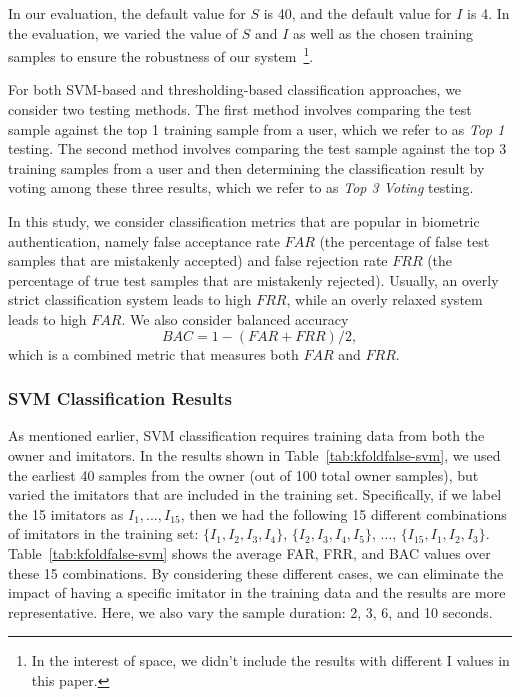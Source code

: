 In our evaluation, the default value for $S$ is 40, and the default value for $I$ is 4. In the evaluation, we varied the value of $S$ and $I$ as well as the chosen training samples to ensure the robustness of our system~\footnote{In the interest of space, we didn't include the results with different I values in this paper.}.


For both SVM-based and thresholding-based classification approaches, we consider two testing methods. The first method involves comparing the test sample against the top 1 training sample from a user, which we refer to as \emph{Top 1} testing. The second method involves comparing the test sample against the top 3 training samples from a user and then determining the classification result by voting among these three results, which we refer to as \emph{Top 3 Voting} testing.

In this study, we consider classification metrics that are popular in biometric authentication, namely false acceptance rate $FAR$ (the percentage of false test samples that are mistakenly accepted) and false rejection rate $FRR$ (the percentage of true test samples that are mistakenly rejected). Usually, an overly strict classification system leads to high $FRR$, while an overly relaxed system leads to high $FAR$. We also consider balanced accuracy $$BAC = 1 - (FAR+FRR)/2,$$ which is a combined metric that measures both $FAR$ and $FRR$.



\subsubsection{SVM Classification Results}

As mentioned earlier, SVM classification requires training data from both the owner and imitators. In the results shown in Table~\ref{tab:kfoldfalse-svm}, we used the earliest 40 samples from the owner (out of 100 total owner samples), but varied the imitators that are included in the training set. Specifically, if we label the 15 imitators as $I_1, ..., I_{15}$, then we had the following 15 different combinations of imitators in the training set: $\{I_1, I_2, I_3, I_4\}$, $\{I_2, I_3, I_4, I_5\}$, $\dots$, $\{I_{15}, I_1, I_2, I_3\}$.  Table~\ref{tab:kfoldfalse-svm} shows the average FAR, FRR, and BAC values over these 15 combinations. By considering these different cases, we can eliminate the impact of having a specific imitator in the training data and the results are more representative. Here, we also vary the sample duration: 2, 3, 6, and 10 seconds.

